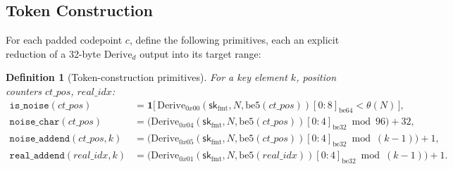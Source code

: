 \documentclass[11pt,a4paper]{article}
\newtheorem{definition}[theorem]{Definition}
\begin{document}
\subsection{Token Construction}
\label{sec:token-construction}

For each padded codepoint $c$, define the following primitives, each an
explicit reduction of a 32-byte $\mathrm{Derive}_d$ output into its target
range:

\begin{definition}[Token-construction primitives]\label{def:token-prims}
For a key element $k$, position counters $ct\_pos$, $real\_idx$:
\begin{align*}
  \texttt{is\_noise}(ct\_pos) &= \mathbf{1}\bigl[\,\mathrm{Derive}_{0x00}(\mathsf{sk}_{\mathrm{fmt}}, N, \mathrm{be5}(ct\_pos))[0{:}8]_{\mathrm{be64}} < \theta(N)\,\bigr], \\
  \texttt{noise\_char}(ct\_pos) &= \bigl(\mathrm{Derive}_{0x04}(\mathsf{sk}_{\mathrm{fmt}}, N, \mathrm{be5}(ct\_pos))[0{:}4]_{\mathrm{be32}} \bmod 96\bigr) + 32, \\
  \texttt{noise\_addend}(ct\_pos, k) &= \bigl(\mathrm{Derive}_{0x05}(\mathsf{sk}_{\mathrm{fmt}}, N, \mathrm{be5}(ct\_pos))[0{:}4]_{\mathrm{be32}} \bmod (k-1)\bigr) + 1, \\
  \texttt{real\_addend}(real\_idx, k) &= \bigl(\mathrm{Derive}_{0x01}(\mathsf{sk}_{\mathrm{fmt}}, N, \mathrm{be5}(real\_idx))[0{:}4]_{\mathrm{be32}} \bmod (k-1)\bigr) + 1.
\end{align*}
\end{definition}
\end{document}
